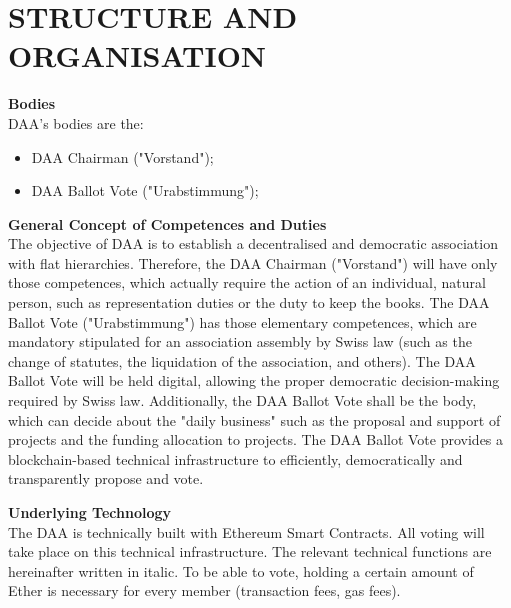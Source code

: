 \section{STRUCTURE AND ORGANISATION}\label{sec:structure-and-organisation}

\item \textbf{Bodies} \\
DAA's bodies are the:
\begin{itemize}
    \item DAA Chairman ("Vorstand");
    \item DAA Ballot Vote ("Urabstimmung");
\end{itemize}

\item \textbf{General Concept of Competences and Duties} \\
The objective of DAA is to establish a decentralised and democratic association with flat hierarchies.
Therefore, the DAA Chairman ("Vorstand") will have only those competences, which actually require the action of an individual, natural person, such as representation duties or the duty to keep the books.
The DAA Ballot Vote ("Urabstimmung") has those elementary competences, which are mandatory stipulated for an association assembly by Swiss law (such as the change of statutes, the liquidation of the association, and others).
The DAA Ballot Vote will be held digital, allowing the proper democratic decision-making required by Swiss law.
Additionally, the DAA Ballot Vote shall be the body, which can decide about the "daily business" such as the proposal and support of projects and the funding allocation to projects.
The DAA Ballot Vote provides a blockchain-based technical infrastructure to efficiently, democratically and transparently propose and vote.

\item \textbf{Underlying Technology} \\
The DAA is technically built with Ethereum Smart Contracts.
All voting will take place on this technical infrastructure.
The relevant technical functions are hereinafter written in italic.
To be able to vote, holding a certain amount of Ether is necessary for every member (transaction fees, gas fees).


